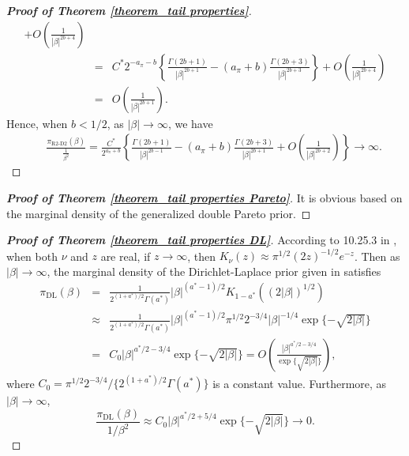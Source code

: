 \documentclass[12pt]{article}
\begin{document}
\begin{proof} [\textbf{Proof of Theorem \ref{theorem_tail properties}}]
\begin{eqnarray}
		+ O(\frac{1}{|\beta|^{2b+4}}) \nonumber \\
		&=& C^\ast  2^{-a_\pi-b} \left\{ \frac{\Gamma(2b+1)}{|\beta|^{2b+1}} -(a_\pi+b)\frac{\Gamma(2b+3)}{|\beta|^{2b+3}} \right\}  + O(\frac{1}{|\beta|^{2b+4}})  \label{eq-temp}    \label{eq_tail_detail}\\
		&=& O(\frac{1}{|\beta|^{2b+1} }).  \nonumber
	\end{eqnarray}
	Hence,  when $b < 1/2$,   as $|\beta|\rightarrow \infty$,   we have
	\begin{eqnarray*}
		&& \frac{\pi_{\text{R2-D2}}(\beta)}{\frac{1}{\beta^2}}
		= \frac{C^\ast}{  2^{a_\pi+b}} \left\{ \frac{\Gamma(2b+1)}{|\beta|^{2b-1}} -(a_\pi+b)\frac{\Gamma(2b+3)}{|\beta|^{2b+1}} + O(\frac{1}{|\beta|^{2b+2}}) \right\}\rightarrow \infty .
	\end{eqnarray*}
\end{proof}

\begin{proof} [\textbf{Proof of Theorem \ref{theorem_tail properties Pareto}}]
	It is obvious   based on the marginal density of the generalized double Pareto prior.
\end{proof}


\begin{proof} [\textbf{Proof of Theorem \ref{theorem_tail properties DL}}]	 %
	According to %
	{10.25.3} in \cite{NISTDLMF}, when both $\nu$ and $z$ are real,  if $z\rightarrow\infty$, then   $K_\nu (z) \approx  \pi^{1/2} (2z)^{-1/2}e^{-z}$.    Then as $|\beta| \rightarrow \infty$, the  marginal density of the Dirichlet-Laplace prior given in \cite{bhattacharya2015dirichlet}  satisfies
	\begin{eqnarray*}
		\pi_{\text{DL}}(\beta)
		&=&  \frac{1}{2^{(1+a^\ast)/2}\Gamma(a^\ast)}  |\beta|^{(a^\ast-1)/2} K_{1-a^\ast}((2|\beta|)^{1/2}) \\
		&\approx &  \frac{1}{2^{(1+a^\ast)/2}\Gamma(a^\ast)}  |\beta|^{(a^\ast-1)/2}  \pi^{1/2}  2^{-3/4}  |\beta|^{-1/4} \exp \{- \sqrt{2|\beta|}\}  \\
		&=&  C_0 |\beta|^{a^\ast/2-3/4} \exp \{- \sqrt{2|\beta|}\}
		= O(\frac{|\beta|^{a^\ast/2-3/4}}{ \exp\{ { \sqrt{2|\beta|}\} } }) ,
	\end{eqnarray*}
	where $C_0 = { {\pi^{1/2} 2^{-3/4}}} / \{2^{(1+a^\ast)/2}\Gamma(a^\ast)\}$ is a constant value.
	Furthermore,  as $|\beta| \rightarrow \infty$,
	\[
	\frac{\pi_{\text{DL}}(\beta) }{1/\beta^2} \approx  C_0 |\beta|^{a^\ast/2+5/4}  \exp \{- \sqrt{2|\beta|}\}   \rightarrow 0 .
	\]
\end{proof}
\end{document}
